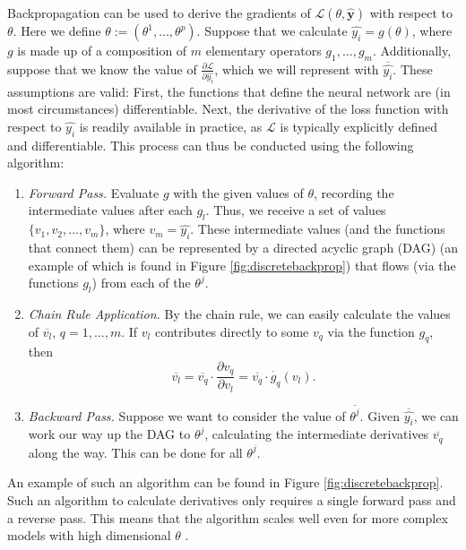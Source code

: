 \documentclass[a4paper,11pt,titlepage]{article}
\theoremstyle{definition}
\theoremstyle{plain}
\theoremstyle{remark}
\begin{document}
Backpropagation can be used to derive the gradients of $\mathcal{L}(\theta, \mathbf{\hat{y}})$ with respect to $\theta$. Here we define $\theta :=  (\theta^1, \dots, \theta^p)$. Suppose that we calculate $\hat{y_i} = g(\theta)$, where $g$ is made up of a composition of $m$ elementary operators $g_1, \dots, g_m$. Additionally, suppose that we know the value of $\frac{\partial \mathcal{L}}{\partial \hat{y_i}}$, which we will represent with $\overline{\hat{y_i}}$. These assumptions are valid: First, the functions that define the neural network are (in most circumstances) differentiable. Next, the derivative of the loss function with respect to $\hat{y_i}$ is readily available in practice, as $\mathcal{L}$ is typically explicitly defined and differentiable. This process can thus be conducted using the following algorithm:
\begin{enumerate}
    \item \textit{Forward Pass.} Evaluate $g$ with the given values of $\theta$, recording the intermediate values after each $g_l$. Thus, we receive a set of values $\{v_1, v_2, \dots, v_m \}$, where $v_m = \hat{y_i}$. These intermediate values (and the functions that connect them) can be represented by a directed acyclic graph (DAG) (an example of which is found in Figure \ref{fig:discretebackprop}) that flows (via the functions $g_l$) from each of the $\theta^j$.
    \item \textit{Chain Rule Application.} By the chain rule, we can easily calculate the values of $\overline{v_l}$, $q = 1, \dots, m$. If $v_l$ contributes directly to some $v_{q}$ via the function $g_q$, then
    \begin{equation}
    \overline{v_l} = \overline{v_{q}} \cdot \frac{\partial v_{q}}{\partial v_l} = \overline{v_{q}} \cdot \dot{g_q}(v_l).
    \label{eq:chainrule}
    \end{equation}
    \item \textit{Backward Pass.} Suppose we want to consider the value of $\overline{\theta^j}$. Given $\overline{\hat{y_i}}$, we can work our way up the DAG to $\theta^j$, calculating the intermediate derivatives $\overline{v_q}$ along the way. This can be done for all $\theta^j$.
\end{enumerate}

An example of such an algorithm can be found in Figure \ref{fig:discretebackprop}. Such an algorithm to calculate derivatives only requires a single forward pass and a reverse pass. This means that the algorithm scales well even for more complex models with high dimensional $\theta$ \cite{ketkar2017}.
\end{document}
